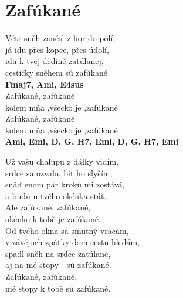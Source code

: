 \section{Zafúkané}
\onehalfspacing

Větr sněh zanésl z hor do polí,\\
já idu přes kopce, přes údolí,\\
idu k tvej dědině zatúlanej,\\
cestičky sněhem sú zafúkané\\
\textbf{Fmaj7, Ami, E4sus}\\

{}Zafúkané, zafúkané\\
kolem mňa ,všecko je ,zafúkané\\
Zafúkané, zafúkané\\
kolem mňa ,všecko je ,zafúkané\\

\textbf{Ami, Emi, D, G, H7, Emi, D, G, H7, Emi}\\

\singlespacing

Už vašu chalupu z dálky vidím,\\
srdce sa ozvalo, bit ho slyším,\\
snáď enom pár kroků mi zostává,\\
a budu u tvého okénka stát.\\

Ale zafúkané, zafúkané,\\
okénko k tobě je zafúkané. \\

Od tvého okna sa smutný vracám,\\
v závějoch zpátky dom cestu hledám,\\
spadl sněh na srdce zatúlané,\\
aj na mé stopy - sú zafúkané.\\

Zafúkané, zafúkané,\\
mé stopy k tobě sú zafúkané. \\






